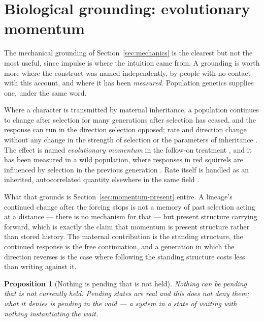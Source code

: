 \documentclass[11pt,a4paper]{article}
\newtheorem{proposition}[definition]{Proposition}
\theoremstyle{remark}
\begin{document}
\section{Biological grounding: evolutionary momentum}\label{sec:evolutionary}

The mechanical grounding of Section~\ref{sec:mechanics} is the clearest but not the most useful,
since impulse is where the intuition came from. A grounding is worth more where the construct was
named independently, by people with no contact with this account, and where it has been
\emph{measured}. Population genetics supplies one, under the same word.

Where a character is transmitted by maternal inheritance, a population continues to change after
selection for many generations after selection has ceased, and the response can run in the direction
selection opposed; rate and direction change without any change in the strength of selection or the
parameters of inheritance \citep{kirkpatricklande1989}. The effect is named \emph{evolutionary
momentum} in the follow-on treatment \citep{landekirkpatrick1990}, and it has been measured in a wild
population, where responses in red squirrels are influenced by selection in the previous generation
\citep{mcadamboutin2004}. Rate itself is handled as an inherited, autocorrelated quantity elsewhere in
the same field \citep{thorne1998}.

What that grounds is Section~\ref{sec:momentum-present} entire. A lineage's continued change after the
forcing stops is not a memory of past selection acting at a distance --- there is no mechanism for
that --- but present structure carrying forward, which is exactly the claim that momentum is present
structure rather than stored history. The maternal contribution is the standing structure, the
continued response is the free continuation, and a generation in which the direction reverses is the
case where following the standing structure costs less than writing against it.

\begin{proposition}[Nothing is pending that is not held]\label{prop:no-unheld-pending}
Nothing can be pending that is not currently held. Pending states are real and this does not deny
them; what it denies is pending in the void --- a system in a state of waiting with nothing
instantiating the wait.
\end{proposition}
\end{document}
